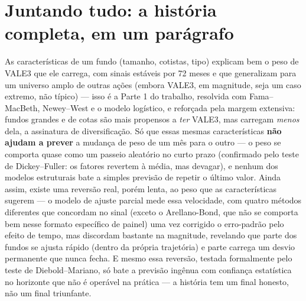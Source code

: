 \documentclass[11pt,a4paper]{article}
\begin{document}
\section{Juntando tudo: a história completa, em um parágrafo}

As características de um fundo (tamanho, cotistas, tipo) explicam bem o peso de VALE3 que ele
carrega, com sinais estáveis por 72 meses e que generalizam para um universo amplo de outras
ações (embora VALE3, em magnitude, seja um caso extremo, não típico) --- isso é a Parte 1 do
trabalho, resolvida com Fama--MacBeth, Newey--West e o modelo logístico, e reforçada pela margem
extensiva: fundos grandes e de cotas são mais propensos a \emph{ter} VALE3, mas carregam
\emph{menos} dela, a assinatura de diversificação. Só que essas mesmas características
\textbf{não ajudam a prever} a mudança de peso de um mês para o outro --- o peso se comporta
quase como um passeio aleatório no curto prazo (confirmado pelo teste de Dickey--Fuller: os
fatores revertem à média, mas devagar), e nenhum dos modelos estruturais bate a simples previsão
de repetir o último valor. Ainda assim, existe uma reversão real, porém lenta, ao peso que as
características sugerem --- o modelo de ajuste parcial mede essa velocidade, com quatro métodos
diferentes que concordam no sinal (exceto o Arellano-Bond, que não se comporta bem nesse formato
específico de painel) uma vez corrigido o erro-padrão pelo efeito de tempo, mas discordam
bastante na magnitude, revelando que parte dos fundos se ajusta rápido (dentro da própria
trajetória) e parte carrega um desvio permanente que nunca fecha. E mesmo essa reversão, testada
formalmente pelo teste de Diebold--Mariano, só bate a previsão ingênua com confiança estatística
no horizonte que não é operável na prática --- a história tem um final honesto, não um final
triunfante.
\end{document}
